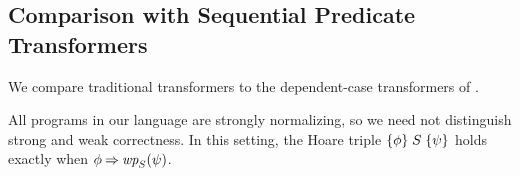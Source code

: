 


\subsection{Comparison with Sequential Predicate Transformers}

We compare traditional transformers to the dependent-case transformers of
. %

All programs in our language are strongly normalizing, so we
need not distinguish strong and weak correctness.  In this setting, the Hoare
triple $\{\phi\}\allowbreak\;S\;\allowbreak\{\psi\}$ holds exactly when
$\aForm \limplies \fwp{\aCmd}{\bForm}$.

